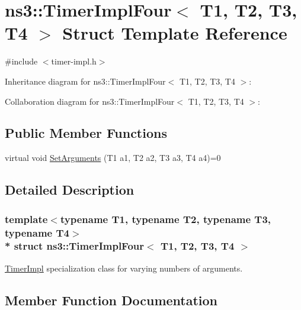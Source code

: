 \hypertarget{structns3_1_1TimerImplFour}{}\section{ns3\+:\+:Timer\+Impl\+Four$<$ T1, T2, T3, T4 $>$ Struct Template Reference}
\label{structns3_1_1TimerImplFour}


{\ttfamily \#include $<$timer-\/impl.\+h$>$}



Inheritance diagram for ns3\+:\+:Timer\+Impl\+Four$<$ T1, T2, T3, T4 $>$\+:


Collaboration diagram for ns3\+:\+:Timer\+Impl\+Four$<$ T1, T2, T3, T4 $>$\+:
\subsection*{Public Member Functions}
\begin{DoxyCompactItemize}
\item 
virtual void \hyperlink{structns3_1_1TimerImplFour_a5eb9cd81d285a4a34ee8dcd3f71c8752}{Set\+Arguments} (T1 a1, T2 a2, T3 a3, T4 a4)=0
\end{DoxyCompactItemize}


\subsection{Detailed Description}
\subsubsection*{template$<$typename T1, typename T2, typename T3, typename T4$>$\\*
struct ns3\+::\+Timer\+Impl\+Four$<$ T1, T2, T3, T4 $>$}

\hyperlink{classns3_1_1TimerImpl}{Timer\+Impl} specialization class for varying numbers of arguments. 

\subsection{Member Function Documentation}
